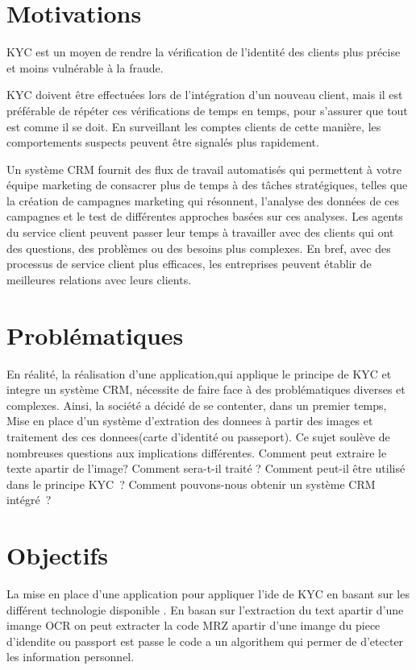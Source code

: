 \section{Motivations}

KYC est un moyen de rendre la vérification de l'identité des clients plus précise et moins vulnérable à la fraude.

KYC doivent être effectuées lors de l'intégration d'un nouveau client, mais il est préférable de répéter ces vérifications de temps en temps, pour s'assurer que tout est comme il se doit. En surveillant les comptes clients de cette manière, les comportements suspects peuvent être signalés plus rapidement.

Un système CRM fournit des flux de travail automatisés qui permettent à votre équipe marketing de consacrer plus de temps à des tâches stratégiques, telles que la création de campagnes marketing qui résonnent, l'analyse des données de ces campagnes et le test de différentes approches basées sur ces analyses. Les agents du service client peuvent passer leur temps à travailler avec des clients qui ont des questions, des problèmes ou des besoins plus complexes. En bref, avec des processus de service client plus efficaces, les entreprises peuvent établir de meilleures relations avec leurs clients.

\section{Problématiques}

En réalité, la réalisation d'une application,qui applique le principe de KYC et integre un  système CRM,
nécessite
de faire face à des problématiques diverses et complexes. Ainsi, la société a décidé de se contenter,
dans un premier temps, Mise en place d’un système d’extration des donnees à partir des images et traitement des ces donnees(carte d'identité ou passeport).
Ce sujet soulève de nombreuses questions aux implications différentes. Comment peut extraire le texte apartir de l'image? Comment sera-t-il traité ? Comment peut-il être utilisé dans le principe KYC ? Comment pouvons-nous obtenir un système CRM intégré ?


\section{Objectifs}

La mise en place d'une application pour appliquer l'ide de KYC en basant sur les différent technologie disponible . En basan sur l'extraction du text apartir d'une imange OCR on peut extracter la code MRZ apartir d'une imange du piece d'idendite ou passport est passe le code a un algorithem qui permer de d'etecter les information personnel.


